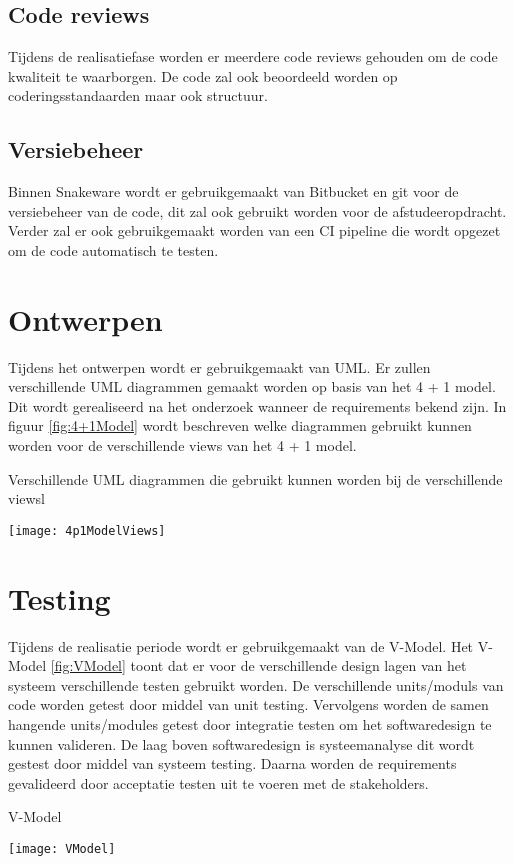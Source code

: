 \subsection{Code reviews}
Tijdens de realisatiefase worden er meerdere code reviews gehouden om de code kwaliteit te waarborgen.
De code zal ook beoordeeld worden op coderingsstandaarden maar ook structuur. 
\subsection{Versiebeheer}
Binnen Snakeware wordt er gebruikgemaakt van Bitbucket en git voor de versiebeheer van de code, dit zal ook gebruikt worden voor de afstudeeropdracht.
Verder zal er ook gebruikgemaakt worden van een CI pipeline die wordt opgezet om de code automatisch te testen.
\section{Ontwerpen}
\label{sec:Ontwerpen}
Tijdens het ontwerpen wordt er gebruikgemaakt van UML.
Er zullen verschillende UML diagrammen gemaakt worden op basis van het 4 + 1 model.
Dit wordt gerealiseerd na het onderzoek wanneer de requirements bekend zijn.
In figuur \ref{fig:4+1Model} wordt beschreven welke diagrammen gebruikt kunnen worden voor de verschillende views van het 4 + 1 model.
\begin{graphic}
    \captionsetup{type=figure}
    \caption{Verschillende UML diagrammen die gebruikt kunnen worden bij de verschillende viewsl}
    \texttt{[image: 4p1ModelViews]}
    \label{fig:4+1Model}
\end{graphic}
\section{Testing}
\label{sec:Testing}
Tijdens de realisatie periode wordt er gebruikgemaakt van de V-Model.
Het V-Model \ref{fig:VModel} toont dat er voor de verschillende design lagen van het systeem verschillende testen gebruikt worden.
De verschillende units/moduls van code worden getest door middel van unit testing.
Vervolgens worden de samen hangende units/modules getest door integratie testen om het softwaredesign te kunnen valideren.
De laag boven softwaredesign is systeemanalyse dit wordt gestest door middel van systeem testing.
Daarna worden de requirements gevalideerd door acceptatie testen uit te voeren met de stakeholders.
\begin{graphic}
    \captionsetup{type=figure}
    \caption{V-Model}
    \texttt{[image: VModel]}
    \label{fig:VModel}
\end{graphic}
